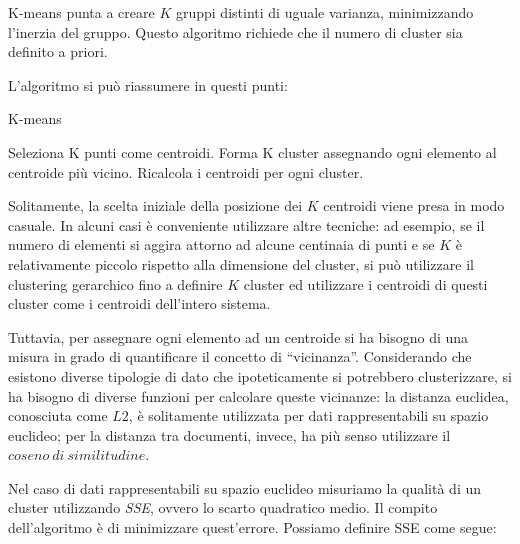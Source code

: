 K-means punta a creare $K$ gruppi distinti di uguale varianza, minimizzando l'inerzia del gruppo. Questo algoritmo richiede che il numero di cluster sia definito a priori.

%

L'algoritmo si può riassumere in questi punti:
\begin{algorithm}
	\begin{algorithmic}[1]
  		\caption{K-means}
		\State Seleziona K punti come centroidi.
		\Repeat
			\State Forma K cluster assegnando ogni elemento al centroide più vicino.
			\State Ricalcola i centroidi per ogni cluster.
  	\end{algorithmic}
\end{algorithm}

Solitamente, la scelta iniziale della posizione dei $K$ centroidi viene presa in modo casuale. In alcuni casi è conveniente utilizzare altre tecniche: ad esempio, se il numero di elementi si aggira attorno ad alcune centinaia di punti e se $K$ è relativamente piccolo rispetto alla dimensione del cluster, si può utilizzare il clustering gerarchico fino a definire $K$ cluster ed utilizzare i centroidi di questi cluster come i centroidi dell'intero sistema.

Tuttavia, per assegnare ogni elemento ad un centroide si ha bisogno di una misura in grado di quantificare il concetto di ``vicinanza''. Considerando che esistono diverse tipologie di dato che ipoteticamente si potrebbero clusterizzare, si ha bisogno di diverse funzioni per calcolare queste vicinanze: la distanza euclidea, conosciuta come $L2$, è solitamente utilizzata per dati rappresentabili su spazio euclideo; per la distanza tra documenti, invece, ha più senso utilizzare il $coseno\ di\ similitudine$.

Nel caso di dati rappresentabili su spazio euclideo misuriamo la qualità di un cluster utilizzando \emph{SSE}, ovvero lo scarto quadratico medio. Il compito dell'algoritmo è di minimizzare quest'errore. Possiamo definire SSE come segue:

